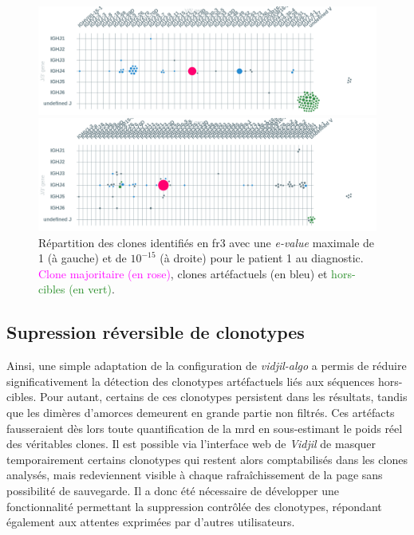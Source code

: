 \begin{figure}[H]
    \begin{minipage}{0.50\textwidth}
        \centering
        \includegraphics[width=1\textwidth]{images/diag_fr3.png}
    \end{minipage}
    \begin{minipage}{0.50\textwidth}
        \centering
        \includegraphics[width=1\textwidth]{images/diag_fr3_e-15.png}
    \end{minipage}
    \caption{
        Répartition des clones identifiés en \gls{fr}3 avec une \textit{e-value} maximale de 1 (à gauche)
        et de $10^{-15}$ (à droite) pour le patient 1 au diagnostic. \textcolor{Magenta}{Clone majoritaire (en rose)},
        \textcolor{ProcessBlue}{clones artéfactuels (en bleu)} et \textcolor{ForestGreen}{hors-cibles (en vert)}.
    }
    \label{fig:fr3-evalue}
\end{figure}

\subsection{Supression réversible de clonotypes}

Ainsi, une simple adaptation de la configuration de \textit{vidjil-algo} a
permis de réduire significativement la détection des clonotypes artéfactuels
liés aux séquences hors-cibles. Pour autant, certains de ces clonotypes
persistent dans les résultats, tandis que les dimères d'amorces demeurent en
grande partie non filtrés. Ces artéfacts fausseraient dès lors toute
quantification de la \gls{mrd} en sous-estimant le poids réel des véritables
clones. Il est possible via l'interface web de \textit{Vidjil} de masquer
temporairement certains clonotypes qui restent alors comptabilisés dans les
clones analysés, mais redeviennent visible à chaque rafraîchissement de la page
sans possibilité de sauvegarde. Il a donc été nécessaire de développer une
fonctionnalité permettant la suppression contrôlée des clonotypes, répondant
également aux attentes exprimées par d'autres utilisateurs.

